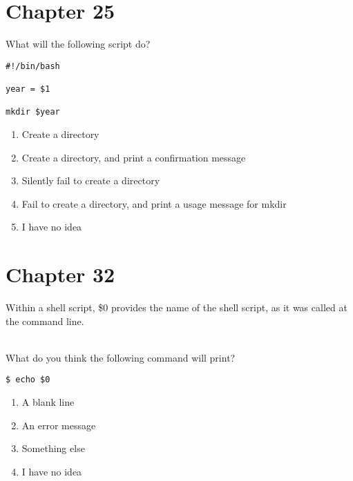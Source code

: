 \documentclass{beamer}
\begin{document}
\section{Chapter 25}

\begin{frame}[fragile]

What will the following script do?


\begin{verbatim}
#!/bin/bash 

year = $1

mkdir $year

\end{verbatim}



\begin{enumerate}[label=\Alph*)]

\item Create a directory

\item Create a directory, and print a confirmation message

\item Silently fail to create a directory

\item Fail to create a directory, and print a usage message for mkdir

\item I have no idea

\end{enumerate}

\end{frame}


\section{Chapter 32}

\begin{frame}[fragile]

Within a shell script, \$0 provides the name of the shell script, as it was called at the command line.

\ \\ 

What do you think the following command will print?

\begin{verbatim}
$ echo $0
\end{verbatim}

\begin{enumerate}[label=\Alph*)]

\item A blank line

\item An error message

\item Something else

\item I have no idea

\end{enumerate}

\end{frame}
\end{document}
